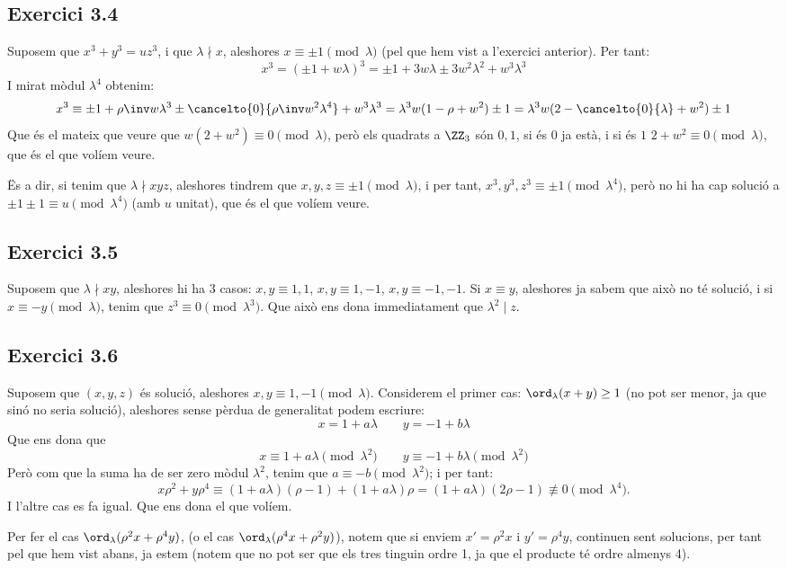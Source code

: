 \documentclass[11pt, a4paper]{article}
\begin{document}
    \subsection{Exercici 3.4}
    Suposem que $x^3+y^3=uz^3$, i que $\lambda\nmid x$, aleshores $x\equiv \pm 1\pmod \lambda$ (pel que hem vist a l'exercici anterior). Per tant:
    \[
        x^3=(\pm1+w\lambda)^3=\pm1 +3w\lambda\pm3w^2\lambda^2+w^3\lambda^3
    \]
    I mirat mòdul $\lambda^4$ obtenim:
    \[
        x^3\equiv\pm1 +\rho\inv w\lambda^3\pm \cancelto{0}{\rho\inv w^2\lambda^4}+w^3\lambda^3=\lambda^3w(1-\rho+w^2)\pm1=\lambda^3 w(2-\cancelto{0}{\lambda}+w^2)\pm1
    \]
    Que és el mateix que veure que $w(2+w^2)\equiv0\pmod \lambda$, però  els quadrats a $\ZZ_3$ són $0,1$, si és 0 ja està, i si és $1$ $2+w^2\equiv 0\pmod \lambda$, que és el que volíem veure.\par
    Ës a dir, si tenim que $\lambda\nmid xyz$, aleshores tindrem que $x,y,z\equiv \pm1\pmod \lambda$, i per tant, $x^3,y^3,z^3\equiv \pm1\pmod \lambda^4$, però no hi ha cap solució a $\pm1\pm1\equiv u\pmod \lambda^4$ (amb $u$ unitat), que és el que volíem veure.
    \subsection{Exercici 3.5}
    Suposem que $\lambda\nmid xy$, aleshores hi ha 3 casos: $x,y\equiv 1,1$, $x,y\equiv 1,-1$, $x,y\equiv -1,-1$. Si $x\equiv y$, aleshores ja sabem que això no té solució, i si $x\equiv-y\pmod \lambda$, tenim que $z^3\equiv 0\pmod\lambda^3$. Que això ens dona immediatament que $\lambda^2\mid z$.
    \subsection{Exercici 3.6}
    Suposem que $(x,y,z)$ és solució, aleshores $x,y\equiv 1,-1\pmod \lambda$.
    Considerem el primer cas: $\ord_\lambda(x+y)\geq1$ (no pot ser menor, ja que sinó no seria solució), aleshores sense pèrdua de generalitat podem escriure:
    \[
        x = 1+a\lambda\qquad y=-1+b\lambda
    \]
    Que ens dona que
    \[
        x\equiv 1+a\lambda \pmod {\lambda^2}\qquad
        y\equiv -1+b\lambda \pmod {\lambda^2}
    \]
    Però com que la suma ha de ser zero mòdul $\lambda^2$, tenim que $a\equiv-b\pmod \lambda^2$; i per tant:
    \[
        x\rho^2+y\rho^4\equiv (1+a\lambda)(\rho-1)+(1+a\lambda)\rho=(1+a\lambda)(2\rho-1)\not\equiv0\pmod{\lambda^4}.
    \]
    I l'altre cas es fa igual. Que ens dona el que volíem.\par
    Per fer el cas $\ord_\lambda(\rho^2x+\rho^4y)$, (o el cas $\ord_\lambda(\rho^4x+\rho^2y)$), notem que si enviem $x'=\rho^2x$ i $y'=\rho^4 y$, continuen sent solucions, per tant pel que hem vist abans, ja estem (notem que no pot ser que els tres tinguin ordre 1, ja que el producte té ordre almenys 4).
\end{document}
